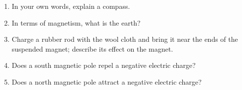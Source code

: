 \begin{enumerate}
\item In your own words, explain a compass.\vspace{15mm}

\item In terms of magnetism, what is the earth?\vspace{15mm}

\item Charge a rubber rod with the wool cloth and bring it near the ends
of the suspended magnet; describe its effect on the magnet.\vspace{15mm}

\item Does a south magnetic pole repel a negative electric charge?\vspace{15mm}

\item Does a north magnetic pole attract a negative electric charge?\vspace{15mm}
\end{enumerate}

